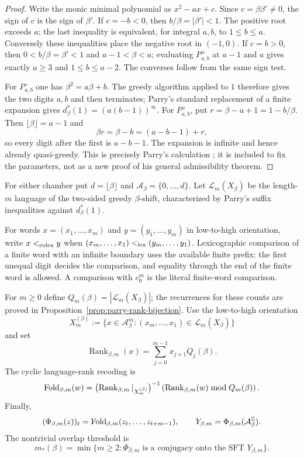 \begin{proof}
Write the monic minimal polynomial as $x^2-ax+c$.  Since
$c=\beta\beta'\ne0$, the sign of $c$ is the sign of $\beta'$.  If
$c=-b<0$, then $b/\beta=|\beta'|<1$.  The positive root exceeds $a$;
the last inequality is equivalent, for integral $a,b$, to $1\le b\le a$.
Conversely these inequalities place the negative root in $(-1,0)$.
If $c=b>0$, then $0<b/\beta=\beta'<1$ and $a-1<\beta<a$; evaluating
$P^+_{a,b}$ at $a-1$ and $a$ gives exactly $a\ge3$ and
$1\le b\le a-2$.  The converses follow from the same sign test.

For $P^-_{a,b}$ one has $\beta^2=a\beta+b$.  The greedy algorithm applied
to $1$ therefore gives the two digits $a,b$ and then terminates; Parry's
standard replacement of a finite expansion gives
$d_\beta^*(1)=(a(b-1))^\infty$.  For $P^+_{a,b}$, put
$r=\beta-a+1=1-b/\beta$.  Then
$\lfloor\beta\rfloor=a-1$ and
\[
\beta r=\beta-b=(a-b-1)+r,
\]
so every digit after the first is $a-b-1$.  The expansion is infinite and
hence already quasi-greedy.  This is precisely Parry's calculation
\cite{Parry1960}; it is included to fix the parameters, not as a new proof of
his general admissibility theorem.
\end{proof}

For either chamber put $d=\lfloor\beta\rfloor$ and
$\mathcal A_\beta=\{0,\ldots,d\}$.  Let $\mathcal L_m(X_\beta)$ be the
length-$m$ language of the two-sided greedy $\beta$-shift, characterized by
Parry's suffix inequalities against $d_\beta^*(1)$.

For words $x=(x_1,\ldots,x_m)$ and $y=(y_1,\ldots,y_m)$ in low-to-high
orientation, write $x<_{\rm colex}y$ when
$(x_m,\ldots,x_1)<_{\rm lex}(y_m,\ldots,y_1)$.  Lexicographic comparison of a
finite word with an infinite boundary uses the available finite prefix: the
first unequal digit decides the comparison, and equality through the end of
the finite word is allowed.  A comparison with $c_0^m$ is the literal
finite-word comparison.

\begin{definition}
\label{def:quadratic-parry-fold}
For $m\ge0$ define $Q_m(\beta)=|\mathcal L_m(X_\beta)|$; the recurrences for
these counts are proved in Proposition~\ref{prop:parry-rank-bijection}.
Use the low-to-high orientation
\[
X_m^{(\beta)}:=\{x\in\mathcal A_\beta^m:
(x_m,\ldots,x_1)\in\mathcal L_m(X_\beta)\}
\]
and set
\[
\operatorname{Rank}_{\beta,m}(x)=\sum_{j=0}^{m-1}x_{j+1}Q_j(\beta).
\]
The cyclic language-rank recoding is
\[
\mathrm{Fold}_{\beta,m}(w)=
\bigl(\operatorname{Rank}_{\beta,m}|_{X_m^{(\beta)}}\bigr)^{-1}
\left(\operatorname{Rank}_{\beta,m}(w)\bmod Q_m(\beta)\right).
\]
Finally,
\[
(\Phi_{\beta,m}(z))_t
=\mathrm{Fold}_{\beta,m}(z_t,\ldots,z_{t+m-1}),\qquad
Y_{\beta,m}=\Phi_{\beta,m}(\mathcal A_\beta^{\mathbb Z}).
\]
The nontrivial overlap threshold is
\[
m_*(\beta)=\min\{m\ge2:\Phi_{\beta,m}\text{ is a conjugacy onto the
SFT }Y_{\beta,m}\}.
\]
\end{definition}


